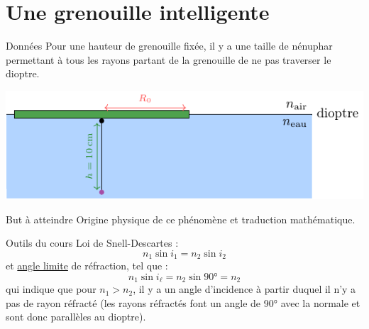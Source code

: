 \documentclass[../main/main.tex]{subfiles}
\begin{document}
\section{Une grenouille intelligente}
\begin{tcbraster}[raster columns=7, raster equal height=rows]
    \begin{NCdefi}[raster multicolumn=4]{Données}
        Pour une hauteur de grenouille fixée, il y a une taille de
        nénuphar permettant à tous les rayons partant de la grenouille de ne
        pas traverser le dioptre.\smallbreak
        \begin{center}
            \includegraphics{../figures/ch2-2-1}   
        \end{center}
    \end{NCdefi}
    \begin{tcolorbox}[blankest, raster multicolumn=3, space to=\myspace]
        \begin{tcbraster}[raster columns=1]
            \begin{NCprop}{But à atteindre}
                Origine physique de ce phénomène et traduction mathématique.
            \end{NCprop}    
            \begin{NCdemo}{Outils du cours}
                Loi de Snell-Descartes :
                \[ n_1\sin i_1 = n_2\sin i_2\]
                et \underline{angle limite} de réfraction, tel que :
                \[ n_1\sin i_\ell = n_2\sin \ang{90;;} = n_2\]
                qui indique que pour $n_1 > n_2$, il y a un angle d'incidence à
                partir duquel il n'y a pas de rayon réfracté (les rayons
                réfractés font un angle de 90° avec la normale et sont donc
                parallèles au dioptre).
            \end{NCdemo}
        \end{tcbraster}
    \end{tcolorbox}
\end{tcbraster}
\end{document}
